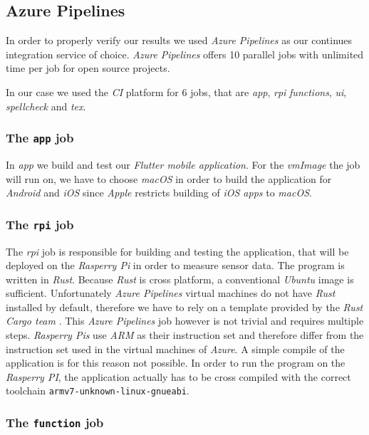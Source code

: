 \subsection{Azure Pipelines}

In order to properly verify our results we used \textit{Azure Pipelines} as our continues
integration service of choice. \textit{Azure Pipelines} offers 10 parallel jobs with unlimited time
per job for open source projects. \cite{azure-pipelines-devop}

In our case we used the \textit{CI} platform for 6 jobs, that are \textit{app}, \textit{rpi}
\textit{functions}, \textit{ui}, \textit{spellcheck} and \textit{tex}.

\subsubsection{The \texttt{app} job}

In \textit{app} we build and test our \textit{Flutter mobile application}. For the \textit{vmImage}
the job will run on, we have to choose \textit{macOS} in order to build the application for
\textit{Android} and \textit{iOS} since \textit{Apple} restricts building of \textit{iOS apps} to
\textit{macOS}.

\subsubsection{The \texttt{rpi} job}

The \textit{rpi} job is responsible for building and testing the application, that will be deployed
on the \textit{Rasperry Pi} in order to measure sensor data. The program is written in
\textit{Rust}. Because \textit{Rust} is cross platform, a conventional \textit{Ubuntu} image is
sufficient. Unfortunately \textit{Azure Pipelines} virtual machines do not have \textit{Rust}
installed by default, therefore we have to rely on a template provided by the \textit{Rust Cargo
team} \cite{rust-cargo}. This \textit{Azure Pipelines} job however is not trivial and requires
multiple steps. \textit{Rasperry Pis} use \textit{ARM} as their instruction set and therefore differ
from the instruction set used in the virtual machines of \textit{Azure}. A simple compile of the
application is for this reason not possible. In order to run the program on the \textit{Rasperry
PI}, the application actually has to be cross compiled with the correct toolchain
\texttt{armv7-unknown-linux-gnueabi}.

\subsubsection{The \texttt{function} job}
\label{sec:azure-function}

